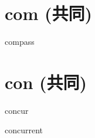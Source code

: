 \chapter{com (共同)}

\begin{word}{compass}
\end{word}

\chapter{con (共同)}
\begin{word}{concur}
\end{word}

\begin{word}{concurrent}
\end{word}